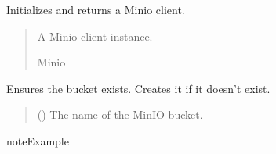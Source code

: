 \documentclass[letterpaper,10pt,english]{sphinxmanual}
\begin{document}
\begin{fulllineitems}
\begin{quote}
\begin{description}
\begin{itemize}
\end{itemize}

\end{description}\end{quote}

\begin{fulllineitems}
\label{\detokenize{src.database:src.database.minio.MinioFileSystem.client}}
\pysigstartsignatures
\pysigline
{}
\pysigstopsignatures
\sphinxAtStartPar
Initializes and returns a Minio client.
\begin{quote}\begin{description}
\sphinxAtStartPar
A Minio client instance.

\sphinxAtStartPar
Minio

\end{description}\end{quote}

\end{fulllineitems}


\begin{fulllineitems}
\label{\detokenize{src.database:src.database.minio.MinioFileSystem.create_bucket}}
\pysigstartsignatures
\pysiglinewithargsret
{}
{}
{}
\pysigstopsignatures
\sphinxAtStartPar
Ensures the bucket exists. Creates it if it doesn’t exist.
\begin{quote}\begin{description}
\sphinxAtStartPar
{} () \textendash{} The name of the MinIO bucket.

\end{description}\end{quote}

\begin{sphinxadmonition}{note}{Example}


\end{sphinxadmonition}
\end{fulllineitems}
\end{fulllineitems}
\end{document}
